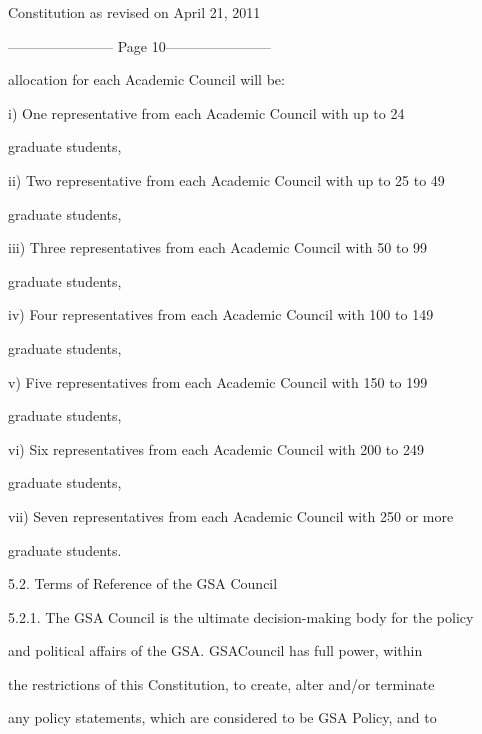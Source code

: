                           Constitution as revised on April 21, 2011  


----------------------- Page 10-----------------------

        allocation for each Academic Council will be:  



i)      One   representative  from   each  Academic   Council   with  up   to  24  

        graduate students,  



ii)     Two representative from each Academic Council with up to 25 to 49  

        graduate students,  



iii)    Three  representatives  from  each  Academic  Council  with  50  to  99  

        graduate students,  



iv)     Four  representatives  from  each  Academic  Council  with  100  to  149  

        graduate students,  



v)      Five  representatives  from  each  Academic  Council  with  150  to  199  

        graduate students,  



vi)     Six  representatives  from  each  Academic  Council  with  200  to  249  

        graduate students,  



vii)    Seven representatives from each Academic Council with 250 or more  

        graduate students.  



5.2.        Terms of Reference of the GSA Council  



5.2.1. The GSA Council is the ultimate decision-making body for the policy  

        and political affairs of  the  GSA. GSACouncil  has  full power,  within  

        the  restrictions  of  this  Constitution,  to  create,  alter  and/or  terminate  

        any policy statements, which are considered to be GSA Policy, and to  

